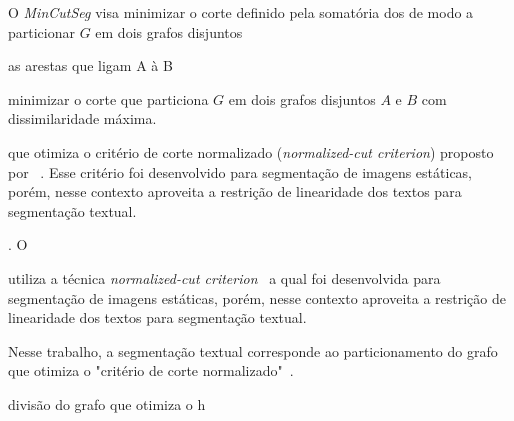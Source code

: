 O \textit{MinCutSeg} visa minimizar o corte definido pela somatória dos de modo a particionar $G$ em dois grafos disjuntos


as arestas que ligam A à B

minimizar o corte que particiona $G$ em dois grafos disjuntos $A$ e $B$ com dissimilaridade máxima. 



que otimiza o critério de corte normalizado (\textit{normalized-cut criterion}) proposto por ~\cite{Shi2000}. Esse critério foi desenvolvido para segmentação de imagens estáticas, porém, nesse contexto aproveita a restrição de linearidade dos textos para segmentação textual.



. O 




utiliza a técnica \textit{normalized-cut criterion}~\cite{Shi2000} a qual foi desenvolvida para segmentação de imagens estáticas, porém, nesse contexto aproveita a restrição de linearidade dos textos para segmentação textual.


Nesse trabalho, a segmentação textual corresponde ao particionamento do grafo que otimiza o "critério de corte normalizado"~\cite{Shi2000}.



divisão do grafo que otimiza o h



